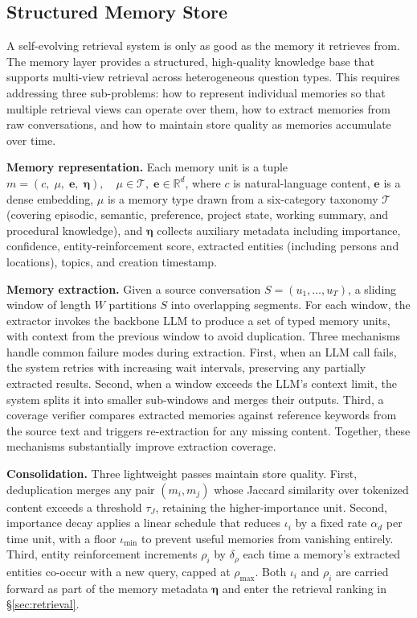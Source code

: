 \subsection{Structured Memory Store}
\label{sec:memory_layer}

A self-evolving retrieval system is only as good as the memory it retrieves from. The memory layer provides a structured, high-quality knowledge base that supports multi-view retrieval across heterogeneous question types. This requires addressing three sub-problems: how to represent individual memories so that multiple retrieval views can operate over them, how to extract memories from raw conversations, and how to maintain store quality as memories accumulate over time.

\noindent \textbf{Memory representation.} Each memory unit is a tuple $m = (c,\; \mu,\; \mathbf{e},\; \boldsymbol{\eta}), \quad
\mu \in \mathcal{T},\; \mathbf{e} \in \mathbb{R}^d$, where $c$ is natural-language content, $\mathbf{e}$ is a dense embedding, $\mu$ is a memory type drawn from a six-category taxonomy $\mathcal{T}$ (covering episodic, semantic, preference, project state, working summary, and procedural knowledge), and $\boldsymbol{\eta}$ collects auxiliary metadata including importance, confidence, entity-reinforcement score, extracted entities (including persons and locations), topics, and creation timestamp.

\noindent \textbf{Memory extraction.} Given a source conversation $S = (u_1, \ldots, u_T)$, a sliding window of length $W$ partitions $S$ into overlapping segments. For each window, the extractor invokes the backbone LLM to produce a set of typed memory units, with context from the previous window to avoid duplication. Three mechanisms handle common failure modes during extraction. First, when an LLM call fails, the system retries with increasing wait intervals, preserving any partially extracted results. Second, when a window exceeds the LLM's context limit, the system splits it into smaller sub-windows and merges their outputs. Third, a coverage verifier compares extracted memories against reference keywords from the source text and triggers re-extraction for any missing content. Together, these mechanisms substantially improve extraction coverage.

\noindent \textbf{Consolidation.} Three lightweight passes maintain store quality. First, deduplication merges any pair $(m_i, m_j)$ whose Jaccard similarity over tokenized content exceeds a threshold $\tau_J$, retaining the higher-importance unit. Second, importance decay applies a linear schedule that reduces $\iota_i$ by a fixed rate $\alpha_d$ per time unit, with a floor $\iota_{\min}$ to prevent useful memories from vanishing entirely. Third, entity reinforcement increments $\rho_i$ by $\delta_\rho$ each time a memory's extracted entities co-occur with a new query, capped at $\rho_{\max}$. Both $\iota_i$ and $\rho_i$ are carried forward as part of the memory metadata $\boldsymbol{\eta}$ and enter the retrieval ranking in \S\ref{sec:retrieval}.

